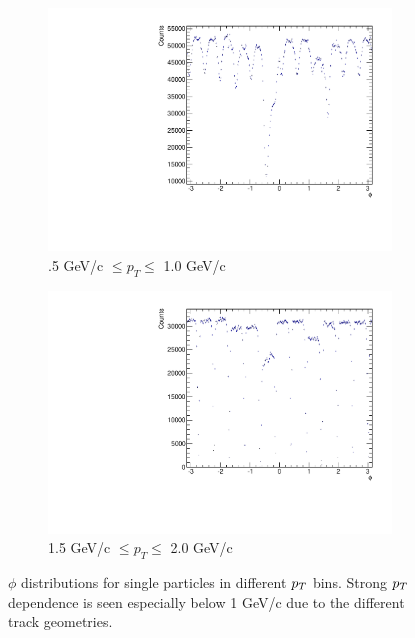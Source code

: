 \begin{figure}[htbp]
\begin{center}
	\begin{subfigure}{.6\textwidth}
		\includegraphics[width=\textwidth]{Plots/Correlations/LowPtPhi.pdf}
		\caption{.5 GeV/c $\leq p_{T} \leq$ 1.0 GeV/c}
		\label{fig:PtDependPhia}
	\end{subfigure}	
	\begin{subfigure}{.6\textwidth}
		\includegraphics[width=\textwidth]{Plots/Correlations/HighPtPhi.pdf}
		\caption{1.5 GeV/c $\leq p_{T} \leq$ 2.0 GeV/c}
		\label{fig:PtDependPhib}
	\end{subfigure}	
\end{center}
\caption[$\pt$ dependence of $\phi$ acceptance]{$\phi$ distributions for single particles in different $\pt$ bins. Strong $\pt$ dependence is seen especially below 1 GeV/c due to the different track geometries.}
\label{fig:PtDependPhi}
\end{figure}

